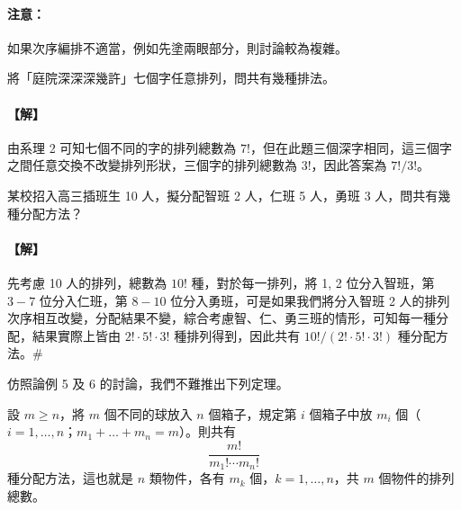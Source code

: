 \vspace{0.5em}
\paragraph{注意：}
如果次序編排不適當，例如先塗兩眼部分，則討論較為複雜。

\vspace{1em}
\begin{discussion}\label{disc:b5-2-5}
將「庭院深深深幾許」七個字任意排列，問共有幾種排法。
\end{discussion}
\paragraph{【解】}
由系理 2 可知七個不同的字的排列總數為 $7!$，但在此題三個深字相同，這三個字之間任意交換不改變排列形狀，三個字的排列總數為 $3!$，因此答案為 $7!/3!$。

\vspace{1em}
\begin{discussion}\label{disc:b5-2-6}
某校招入高三插班生 10 人，擬分配智班 2 人，仁班 5 人，勇班 3 人，問共有幾種分配方法？
\end{discussion}
\paragraph{【解】}
先考慮 10 人的排列，總數為 $10!$ 種，對於每一排列，將 1, 2 位分入智班，第 $3 - 7$ 位分入仁班，第 $8 - 10$ 位分入勇班，可是如果我們將分入智班 2 人的排列次序相互改變，分配結果不變，綜合考慮智、仁、勇三班的情形，可知每一種分配，結果實際上皆由 $2! \cdot 5! \cdot 3!$ 種排列得到，因此共有 $10! / (2! \cdot 5! \cdot 3!)$ 種分配方法。\hfill\#

仿照論例 5 及 6 的討論，我們不難推出下列定理。

\begin{theorem}\label{thm:b5-2-6}
設 $m \ge n$，將 $m$ 個不同的球放入 $n$ 個箱子，規定第 $i$ 個箱子中放 $m_i$ 個（$i=1, \dots, n$；$m_1 + \dots + m_n = m$）。則共有
\begin{equation}
\frac{m!}{m_1! \cdots m_n!}
\end{equation}
種分配方法，這也就是 $n$ 類物件，各有 $m_k$ 個，$k=1, \dots, n$，共 $m$ 個物件的排列總數。
\end{theorem}


